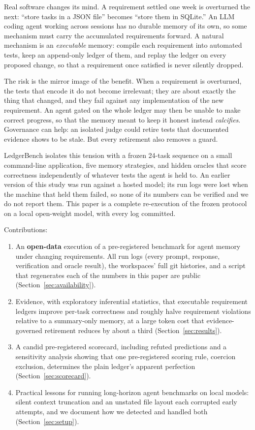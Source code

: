 \documentclass[11pt]{article}
\begin{document}
Real software changes its mind. A requirement settled one week is overturned
the next: ``store tasks in a JSON file'' becomes ``store them in SQLite.'' An
LLM coding agent working across sessions has no durable memory of its own, so
some mechanism must carry the accumulated requirements forward. A natural
mechanism is an \emph{executable} memory: compile each requirement into
automated tests, keep an append-only ledger of them, and replay the ledger on
every proposed change, so that a requirement once satisfied is never silently
dropped.

The risk is the mirror image of the benefit. When a requirement is overturned,
the tests that encode it do not become irrelevant; they are about exactly the
thing that changed, and they fail against any implementation of the new
requirement. An agent gated on the whole ledger may then be unable to make
correct progress, so that the memory meant to keep it honest instead
\emph{calcifies}. Governance can help: an isolated judge could retire tests that
documented evidence shows to be stale. But every retirement also removes a
guard.

LedgerBench isolates this tension with a frozen 24-task sequence on a small
command-line application, five memory strategies, and hidden oracles that score
correctness independently of whatever tests the agent is held to. An earlier
version of this study was run against a hosted model; its run logs were lost
when the machine that held them failed, so none of its numbers can be verified
and we do not report them. This paper is a complete re-execution of the frozen
protocol on a local open-weight model, with every log committed.

Contributions:
\begin{enumerate}
\item An \textbf{open-data} execution of a pre-registered benchmark for agent
memory under changing requirements. All \NNRuns{} run logs (every prompt,
response, verification and oracle result), the workspaces' full git
histories, and a script that regenerates each of the numbers in this paper are
public (Section~\ref{sec:availability}).
\item Evidence, with exploratory inferential statistics, that executable
requirement ledgers improve per-task correctness and roughly halve requirement
violations relative to a summary-only memory, at a large token cost that
evidence-governed retirement reduces by about a third
(Section~\ref{sec:results}).
\item A candid pre-registered scorecard, including refuted predictions and a
sensitivity analysis showing that one pre-registered scoring rule, coercion
exclusion, determines the plain ledger's apparent perfection
(Section~\ref{sec:scorecard}).
\item Practical lessons for running long-horizon agent benchmarks on local
models: silent context truncation and an unstated file layout each corrupted
early attempts, and we document how we detected and handled both
(Section~\ref{sec:setup}).
\end{enumerate}
\end{document}
